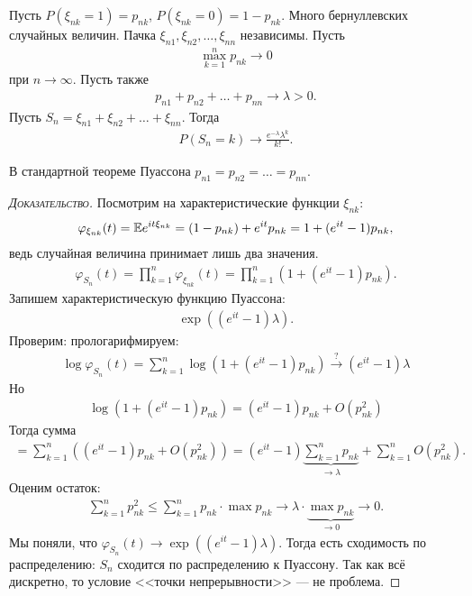 \documentclass[../main.tex]{subfiles}
\begin{document}
\begin{thm}[Пуассона]
 Пусть $ P(\xi_{nk} = 1) = p_{nk} $, $ P(\xi_{nk} = 0) = 1-p_{nk} $. Много бернуллевских случайных величин. Пачка $ \xi_{n 1}, \xi_{n 2}, \ldots, \xi_{n n} $ независимы. Пусть
 \begin{align*}
  \max_{k=1}^{n} p_{nk} \to 0
 \end{align*} при $ n \to \infty $. Пусть также
 \begin{align*}
  p_{n 1}  + p_{n 2} + \ldots + p_{n n} \to \lambda > 0.
 \end{align*} Пусть $ S_n = \xi_{n 1} + \xi_{n 2} + \ldots + \xi_{n n} $. Тогда
 \begin{align*}
  P(S_n = k) \to \frac{e^{-\lambda}\lambda^{k}}{k!}.
 \end{align*}
\end{thm}
В стандартной теореме Пуассона $ p_{n 1} = p_{n 2 } = \ldots = p_{n n} $.
\begin{proof}[\normalfont\textsc{Доказательство}]
 Посмотрим на характеристические функции $ \xi_{n k} $:
 \begin{align*}
  \varphi_{\xi_{n k}}(t) = \mathbb E e^{it \xi_{n k}} = (1 - p_{n k}) + e^{it} p_{n k} = 1 + (e^{it} - 1)p_{n k},
 \end{align*} ведь случайная величина принимает лишь два значения.
 \begin{align*}
  \varphi_{S_n}(t) = \prod_{k=1}^{n} \varphi_{\xi_{n k}}(t) = \prod_{k=1}^{n} (1 + (e^{it} - 1)p_{n k}).
 \end{align*} Запишем характеристическую функцию Пуассона:
 \begin{align*}
  \exp((e^{it} - 1)\lambda).
 \end{align*} Проверим: прологарифмируем:
 \begin{align*}
  \log \varphi_{S_n}(t) = \sum_{k=1}^{n}\log (1 + (e^{it} - 1)p_{nk}) \overset{?}{\to} (e^{it} - 1) \lambda
 \end{align*} Но
 \begin{align*}
  \log(1 + (e^{it} - 1)p_{n k}) = (e^{it} - 1)p_{n k} + O(p_{n k}^{2})
 \end{align*} Тогда сумма
 \begin{align*}
	 = \sum_{k=1}^{n} \left( (e^{it}-1)p_{nk} +O(p_{nk}^{2}) \right) = (e^{it} - 1) \underbrace{\sum_{k=1}^{n}p_{nk}}_{\to \lambda} + \sum_{k = 1}^{n} O(p_{nk} ^{ 2}).
 \end{align*} Оценим остаток:
 \begin{align*}
	 \sum_{k=1}^{n}p_{nk}^{2} \leqslant \sum_{k=1}^{n} p_{nk} \cdot \max p_{n k} \to \lambda \cdot \underbrace{\max p_{nk}}_{\to 0} \to 0.
 \end{align*} Мы поняли, что $ \varphi_{S_n}(t) \to \exp((e^{it}-1)\lambda) $. Тогда есть сходимость по распределению: $ S_n $ сходится по распределению к Пуассону. Так как всё дискретно, то условие <<точки непрерывности>> --- не проблема.
\end{proof}
\end{document}

